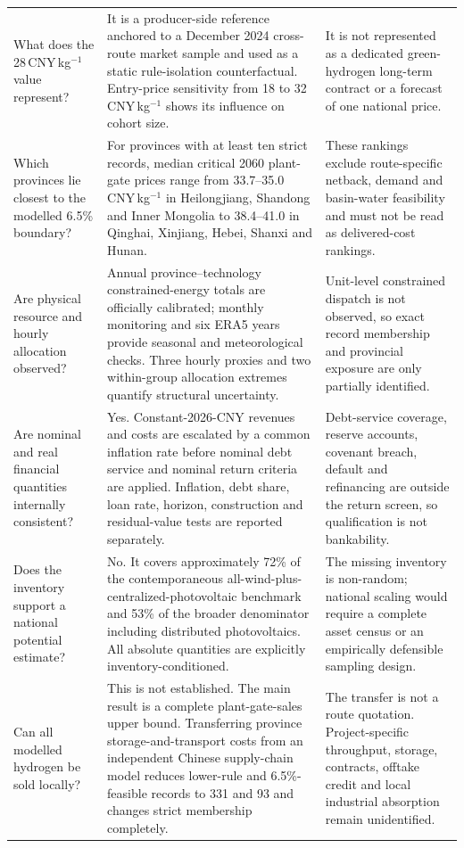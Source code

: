 \documentclass[pdflatex,sn-nature]{sn-jnl}
\begin{document}
\begin{longtable}{>{\raggedright\arraybackslash}p{}>{\raggedright\arraybackslash}p{}>{\raggedright\arraybackslash}p{}}
What does the 28\,CNY\,kg$^{-1}$ value represent? & It is a producer-side reference anchored to a December 2024 cross-route market sample and used as a static rule-isolation counterfactual. Entry-price sensitivity from 18 to 32\,CNY\,kg$^{-1}$ shows its influence on cohort size. & It is not represented as a dedicated green-hydrogen long-term contract or a forecast of one national price. \\
Which provinces lie closest to the modelled 6.5\% boundary? & For provinces with at least ten strict records, median critical 2060 plant-gate prices range from 33.7--35.0\,CNY\,kg$^{-1}$ in Heilongjiang, Shandong and Inner Mongolia to 38.4--41.0 in Qinghai, Xinjiang, Hebei, Shanxi and Hunan. & These rankings exclude route-specific netback, demand and basin-water feasibility and must not be read as delivered-cost rankings. \\
Are physical resource and hourly allocation observed? & Annual province--technology constrained-energy totals are officially calibrated; monthly monitoring and six ERA5 years provide seasonal and meteorological checks. Three hourly proxies and two within-group allocation extremes quantify structural uncertainty. & Unit-level constrained dispatch is not observed, so exact record membership and provincial exposure are only partially identified. \\
Are nominal and real financial quantities internally consistent? & Yes. Constant-2026-CNY revenues and costs are escalated by a common inflation rate before nominal debt service and nominal return criteria are applied. Inflation, debt share, loan rate, horizon, construction and residual-value tests are reported separately. & Debt-service coverage, reserve accounts, covenant breach, default and refinancing are outside the return screen, so qualification is not bankability. \\
Does the inventory support a national potential estimate? & No. It covers approximately 72\% of the contemporaneous all-wind-plus-centralized-photovoltaic benchmark and 53\% of the broader denominator including distributed photovoltaics. All absolute quantities are explicitly inventory-conditioned. & The missing inventory is non-random; national scaling would require a complete asset census or an empirically defensible sampling design. \\
Can all modelled hydrogen be sold locally? & This is not established. The main result is a complete plant-gate-sales upper bound. Transferring province storage-and-transport costs from an independent Chinese supply-chain model reduces lower-rule and 6.5\%-feasible records to 331 and 93 and changes strict membership completely. & The transfer is not a route quotation. Project-specific throughput, storage, contracts, offtake credit and local industrial absorption remain unidentified. \\

\end{longtable}
\end{document}
